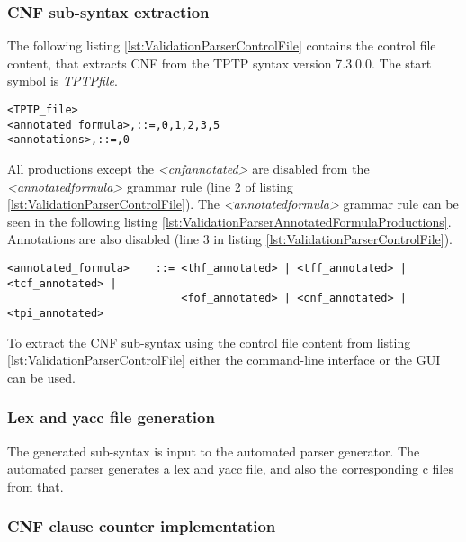 \subsubsection{\ac{CNF} sub-syntax extraction}\label{sec:ValidationAutomatedParserGenerationBuildingBasicParserSubSyntax}

The following listing \ref{lst:ValidationParserControlFile} contains the control file content, that extracts \ac{CNF} from the TPTP syntax version 7.3.0.0.
The start symbol is \textit{TPTP\textunderscore file}.
\begin{lstlisting}[language = None, caption= Control file to extract \ac{CNF}, label= lst:ValidationParserControlFile]
<TPTP_file>
<annotated_formula>,::=,0,1,2,3,5
<annotations>,::=,0
\end{lstlisting}

All productions except the \textit{<cnf\textunderscore annotated>} are disabled from the \textit{<annotated\textunderscore formula>} grammar rule (line 2 of listing \ref{lst:ValidationParserControlFile}).
The \textit{<annotated\textunderscore formula>} grammar rule can be seen in the following listing \ref{lst:ValidationParserAnnotatedFormulaProductions}.
Annotations are also disabled (line 3 in listing \ref{lst:ValidationParserControlFile}).
\begin{lstlisting}[language = None,caption= \textit{<annotated\textunderscore formula>} production rule, label= lst:ValidationParserAnnotatedFormulaProductions]
<annotated_formula>    ::= <thf_annotated> | <tff_annotated> | <tcf_annotated> |
                           <fof_annotated> | <cnf_annotated> | <tpi_annotated>
\end{lstlisting}

To extract the \ac{CNF} sub-syntax using the control file content from listing \ref{lst:ValidationParserControlFile} either the command-line interface or the GUI can be used.

\subsubsection{Lex and yacc file generation}\label{sec:ValidationAutomatedParserGenerationBuildingBasicParserGenerateFiles}

The generated sub-syntax is input to the automated parser generator.
The automated parser generates  a lex and yacc file, and also the corresponding c files from that.

\subsubsection{\ac{CNF} clause counter implementation}\label{sec:ValidationAutomatedParserGenerationBuildingBasicParserClauseCounter}

